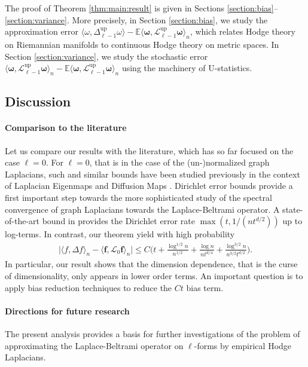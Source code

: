 \documentclass[10pt]{article}
\DeclareMathOperator{\up}{up}
\theoremstyle{plain}
\theoremstyle{definition}
\theoremstyle{remark}
\begin{document}
    The proof of Theorem \ref{thm:main:result} is given in Sections \ref{section:bias}--\ref{section:variance}. More precisely, in Section \ref{section:bias}, we study the approximation error $\langle\omega,\Delta_{\ell-1}^{\up}\omega\rangle-\mathbb{E} \langle\boldsymbol{\omega},\mathscr{L}_{\ell-1}^{\up}\boldsymbol{\omega}\rangle_n$, which relates Hodge theory on Riemannian manifolds to continuous Hodge theory on metric spaces. In Section \ref{section:variance}, we study the stochastic error $\langle\boldsymbol{\omega},\mathscr{L}_{\ell-1}^{\up}\boldsymbol{\omega}\rangle_n-\mathbb{E} \langle\boldsymbol{\omega},\mathscr{L}_{\ell-1}^{\up}\boldsymbol{\omega}\rangle_n$ using the machinery of U-statistics. 

    

\subsection{Discussion}

\paragraph{Comparison to the literature} 
Let us compare our results with the literature, which has so far focused on the case $\ell =0$. For $\ell=0$, that is in the case of the (un-)normalized graph Laplacians, such and similar bounds have been studied previously in the context of Laplacian Eigenmaps and Diffusion Maps \cite{NIPS2006_5848ad95,Gine06,MR4130541,MR4491976,MR4452681}. Dirichlet error bounds provide a first important step towards the more sophisticated study of the spectral convergence of graph Laplacians towards the Laplace-Beltrami operator. A state-of-the-art bound in \cite{MR4452681} provides the Dirichlet error rate $\max(t,1/(nt^{d/2}))$ up to log-terms. In contrast, our theorem yield with high probability
    \begin{align*}
        \big|\langle f,\Delta f\rangle_n-\langle\mathbf{f},\mathscr{L}_{0}\mathbf{f}\rangle_n\big|\leq C\Big(t+\frac{\log^{1/2}n}{n^{1/2}}+\frac{\log n}{nt^{d/4}}+\frac{\log^{3/2} n}{n^{3/2}t^{d/2}}\Big).
    \end{align*}
    In particular, our result shows that the dimension dependence, that is the curse of dimensionality, only appears in lower order terms. An important question is to apply bias  reduction techniques to reduce the $Ct$ bias term. 

\paragraph{Directions for future research}
The present analysis provides a basis for further investigations of the problem of approximating the Laplace-Beltrami operator on $\ell$-forms by empirical Hodge Laplacians.
\end{document}
